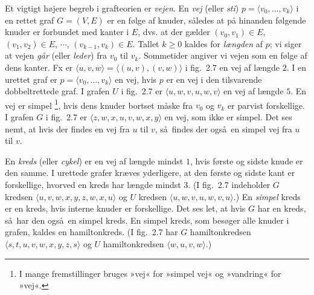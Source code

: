 Et vigtigt højere begreb i grafteorien er \emph{vejen}.
En \emph{vej} (eller \emph{sti}) $p=\langle v_0,\ldots, v_k\rangle$ i en rettet graf $G=(V,E)$ er en følge af knuder, således at på hinanden følgende knuder er forbundet med kanter i $E$, dvs. at der gælder 
$(v_0,v_1)\in E$, 
$(v_1,v_2)\in E$, $\cdots$,
$(v_{k-1},v_k)\in E$.
Tallet $k\geq 0$ kaldes for 
\emph{længden}
af $p$; vi siger at vejen \emph{går} (eller \emph{leder}) fra $v_0$ til $v_k$.
Sommetider angiver vi vejen som en følge af dens kanter.
Fx er $\langle u,v,w\rangle= \langle (u,v), (v,w)\rangle$ i fig.~2.7 en vej af længde $2$.
I en urettet graf er $p=\langle v_0,\ldots, v_k\rangle$ en vej, hvis $p$ er en vej i den tilsvarende dobbeltrettede graf.
I grafen $U$ i fig.~2.7 er $\langle u,w,v,u, w,v\rangle$ en vej af længde $5$.
En vej er simpel%
\footnote{I mange fremstillinger bruges »vej« for »simpel vej« og »vandring« for »vej«.},
hvis dens knuder bortset måske fra $v_0$ og $v_k$ er parvist forskellige.
I grafen $G$ i fig.~2.7 er $\langle z,w,x,u,v,w,x,y\rangle$ en vej, som ikke er simpel.
Det ses nemt, at hvis der findes en vej fra $u$ til $v$, så findes der også en simpel vej fra $u$ til $v$.

En \emph{kreds}
(eller \emph{cykel}) er en vej af længde mindst $1$, hvis første og sidste knude er den samme.
I urettede grafer kræves yderligere, at den første og sidste kant er forskellige, hvorved en kreds har længde mindst $3$.
(I fig.~2.7 indeholder $G$ kredsen $\langle u,v,w,x,y,z,w,x,u\rangle$ og $U$ kredsen $\langle u, w, v, u, w, v, u\rangle$.)
En \emph{simpel} kreds er en kreds, hvis interne knuder er forskellige.
Det ses let, at hvis $G$ har en kreds, så har den også en simpel kreds.
En simpel kreds, som besøger alle knuder i grafen, kaldes en hamiltonkreds.
(I fig.~2.7 har $G$ hamiltonkredsen $\langle s,t,u,v,w,x,y,z,s\rangle$ og $U$ hamiltonkredsen $\langle w,u,v,w\rangle$.)

